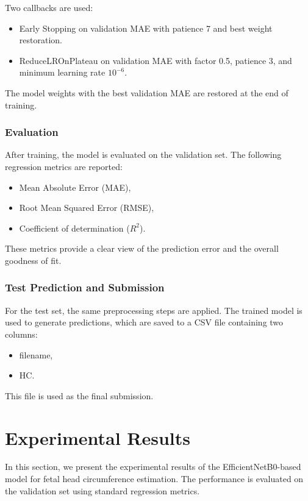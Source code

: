 \documentclass[conference]{IEEEtran}
\begin{document}
Two callbacks are used:
\begin{itemize}
    \item Early Stopping on validation MAE with patience 7 and best weight restoration.
    \item ReduceLROnPlateau on validation MAE with factor 0.5, patience 3, and minimum learning rate $10^{-6}$.
\end{itemize}

The model weights with the best validation MAE are restored at the end of training.

\subsubsection{Evaluation}

After training, the model is evaluated on the validation set. The following regression metrics are reported:
\begin{itemize}
    \item Mean Absolute Error (MAE),
    \item Root Mean Squared Error (RMSE),
    \item Coefficient of determination ($R^2$).
\end{itemize}

These metrics provide a clear view of the prediction error and the overall goodness of fit.

\subsubsection{Test Prediction and Submission}

For the test set, the same preprocessing steps are applied. The trained model is used to generate predictions, which are saved to a CSV file containing two columns:
\begin{itemize}
    \item filename,
    \item HC.
\end{itemize}

This file is used as the final submission.


\section{Experimental Results}

In this section, we present the experimental results of the EfficientNetB0-based model for fetal head circumference estimation. The performance is evaluated on the validation set using standard regression metrics.
\end{document}
